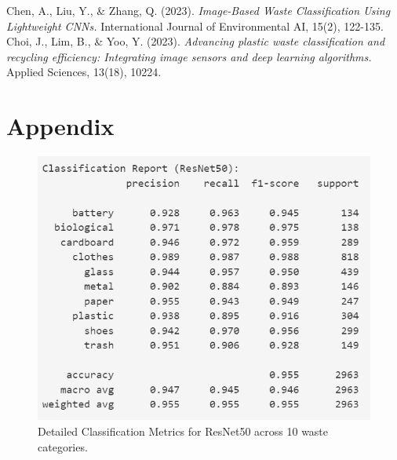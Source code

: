\documentclass[11pt,twocolumn]{article}
\begin{document}
%
\begin{thebibliography}{99}
Chen, A., Liu, Y., \& Zhang, Q. (2023).
\textit{Image-Based Waste Classification Using Lightweight CNNs.}
International Journal of Environmental AI, 15(2), 122-135.
Choi, J., Lim, B., \& Yoo, Y. (2023). 
\textit{Advancing plastic waste classification and recycling efficiency: Integrating image sensors and deep learning algorithms.}
Applied Sciences, 13(18), 10224.
\end{thebibliography}

\appendix
\section{Appendix}
\begin{figure}[h]
    \centering
    \includegraphics[width=\linewidth]{report_images/rnet_metrics.png}
    \caption{Detailed Classification Metrics for ResNet50 across 10 waste categories.}
    \label{fig:gnet_metrics}
\end{figure}
\end{document}
